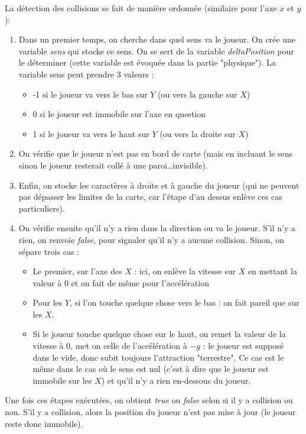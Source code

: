 \documentclass[12pt]{article}
\begin{document}
		La détection des collisions se fait de manière ordonnée (similaire pour l'axe \(x\) et \(y\)):
		\begin{enumerate}
			\item Dans un premier temps, on cherche dans quel sens va le joueur. On crée une variable \textit{sens} qui stocke ce sens. On se sert de la variable \textit{deltaPosition} pour le déterminer (cette variable est évoquée dans la partie "physique"). La variable sens peut prendre 3 valeurs : 
			\begin{itemize}
				\item -1 si le joueur va vers le bas sur \(Y\) (ou vers la gauche sur \(X\))
				\item 0 si le joueur est immobile sur l'axe en question
				\item 1 si le joueur va vers le haut sur \(Y\) (ou vers la droite sur \(X\))
			\end{itemize} 
			\item On vérifie que le joueur n'est pas en bord de carte (mais en incluant le sens sinon le joueur resterait collé à une paroi\dots invisible).
			\item Enfin, on stocke les caractères à droite et à gauche du joueur (qui ne peuvent pas dépasser les limites de la carte, car l'étape d'au dessus enlève ces cas particuliers).
			\item On vérifie ensuite qu'il n'y a rien dans la direction ou va le joueur. S'il n'y a rien, on renvoie \textit{false}, pour signaler qu'il n'y a aucune collision.
			Sinon, on sépare trois cas :
			\begin{itemize}
				\item Le premier, sur l'axe des \(X\) : ici, on enlève la vitesse sur \(X\) en mettant la valeur à 0 et on fait de même pour l'accélération
				\item Pour les \(Y\), si l'on touche quelque chose vers le bas : on fait pareil que sur les \(X\).
				\item Si le joueur touche quelque chose sur le haut, on remet la valeur de la vitesse à 0, met on celle de l'accélération à \(-g\) : le joueur est supposé dans le vide, donc subit toujours l'attraction "terrestre". Ce cas est le même dans le cas où le sens est nul (c'est à dire que le joueur est immobile sur les \(X\)) et qu'il n'y a rien en-dessous du joueur.
			\end{itemize}
		\end{enumerate}
	
		Une fois ces étapes exécutées, on obtient \textit{true} ou  \textit{false} selon si il y a collision ou non. S'il y a collision, alors la position du joueur n'est pas mise à jour (le joueur reste donc immobile).
		
\end{document}
